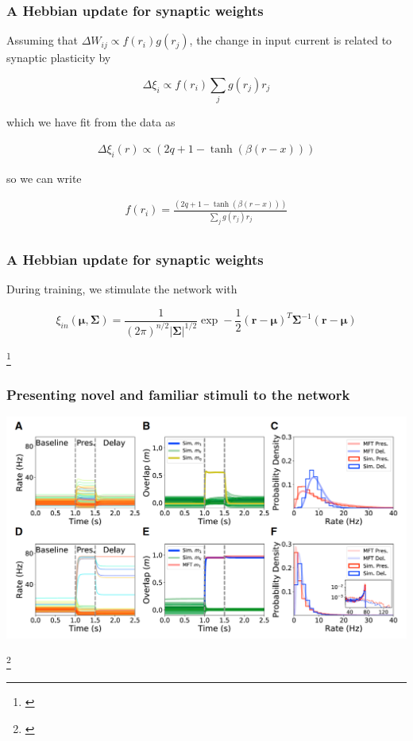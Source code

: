 \documentclass{beamer}
\begin{document}
\begin{frame}[plain]
\frametitle{A Hebbian update for synaptic weights}

Assuming that $\Delta W_{ij} \propto f(r_{i})g(r_{j})$, the change in input current is related to synaptic plasticity by

\begin{equation*}
\Delta \xi_{i}  \propto  f(r_{i}) \sum_{j} g(r_{j})r_{j}
\end{equation*}

which we have fit from the data as 

\begin{align*}
\Delta \xi_{i}(r) \propto (2q + 1 - \tanh (\beta (r-x)))
\end{align*}

so we can write

\begin{align*}
f(r_{i}) =  \frac{(2q + 1 - \tanh (\beta (r-x)))}{\sum_{j} g(r_{j})r_{j}}\\
\end{align*}


\end{frame}

\begin{frame}[plain]
\frametitle{A Hebbian update for synaptic weights}

During training, we stimulate the network with

\begin{equation*}
\xi_{in}(\bm{\mu}, \bm{\Sigma}) = \frac{1}{(2\pi)^{n/2}|\bm{\Sigma}|^{1/2}}\exp-\frac{1}{2}(\bm{r}-\bm{\mu})^{T}\bm{\Sigma}^{-1}(\bm{r}-\bm{\mu})
\end{equation*}



\footnote{\cite{hopfield}}
\end{frame}


\begin{frame}[plain]
\frametitle{Presenting novel and familiar stimuli to the network}

\vspace{0.2in}

\begin{center}
\includegraphics[scale=0.4]{novel-familiar}
\end{center}

\footnote{\cite{peirera}}

\end{frame}
\end{document}
